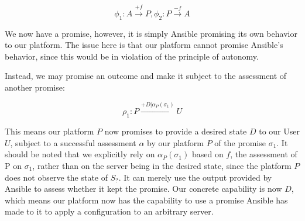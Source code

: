 \[ \phi _1: A \xrightarrow{+f} P, \phi _2: P \xrightarrow{-f} A \]

We now have a promise, however, it is simply Ansible promising its own behavior to our platform.
The issue here is that our platform cannot promise Ansible's behavior, since this would be in violation of the principle of autonomy.
\parencite{promise-theory}
\par
Instead, we may promise an outcome and make it subject to the assessment of another promise:

\[ \rho _1: P \xrightarrow{+D|\alpha _P(\sigma _1)} U \]

This means our platform $P$ now promises to provide a desired state $D$ to our User $U$, subject to a successful assessment $\alpha$ by our platform $P$ of the promise $\sigma _1$.
It should be noted that we explicitly rely on $\alpha _P(\sigma _1)$ based on $f$, the assessment of P on $\sigma _1$, rather than on the server being in the desired state, since the platform $P$ does not observe the state of $S_?
$.
It can merely use the output provided by Ansible to assess whether it kept the promise.
Our concrete capability is now $D$, which means our platform now has the capability to use a promise Ansible has made to it to apply a configuration to an arbitrary server.
\parencite{promise-theory}
